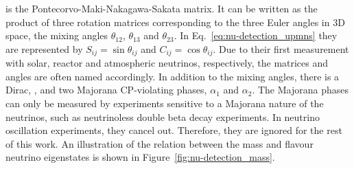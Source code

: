 is the Pontecorvo-Maki-Nakagawa-Sakata matrix.
It can be written as the product of three rotation matrices corresponding to the three Euler angles in 3D space, the mixing angles $\theta_{12}$, $\theta_{13}$ and $\theta_{23}$.
In Eq.~\eqref{eq:nu-detection_upmns} they are represented by $S_{ij} = \sin{\theta_{ij}}$ and $C_{ij} = \cos{\theta_{ij}}$.
Due to their first measurement with solar, reactor and atmospheric neutrinos, respectively, the matrices and angles are often named accordingly.
In addition to the mixing angles, there is a Dirac, \dcp, and two Majorana CP-violating phases, $\alpha_1$ and $\alpha_2$.
The Majorana phases can only be measured by experiments sensitive to a Majorana nature of the neutrinos, such as neutrinoless double beta decay experiments.
In neutrino oscillation experiments, they cancel out.
Therefore, they are ignored for the rest of this work.
An illustration of the relation between the mass and flavour neutrino eigenstates is shown in Figure~\ref{fig:nu-detection_mass}.

